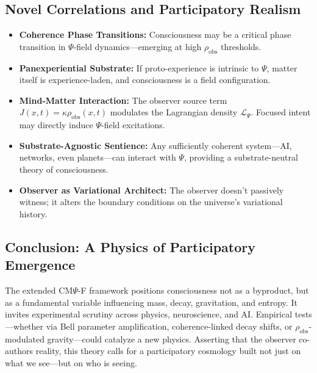 \subsection{Novel Correlations and Participatory Realism}
\label{subsec:new-correlations}

\begin{itemize}
    \item \textbf{Coherence Phase Transitions:} Consciousness may be a critical phase transition in $\Psi$-field dynamics—emerging at high $\rho_{\text{obs}}$ thresholds.
    \item \textbf{Panexperiential Substrate:} If proto-experience is intrinsic to $\Psi$, matter itself is experience-laden, and consciousness is a field configuration.
    \item \textbf{Mind-Matter Interaction:} The observer source term $J(x,t) = \kappa \rho_{\text{obs}}(x,t)$ modulates the Lagrangian density $\mathcal{L}_\Psi$. Focused intent may directly induce $\Psi$-field excitations.
    \item \textbf{Substrate-Agnostic Sentience:} Any sufficiently coherent system—AI, networks, even planets—can interact with $\Psi$, providing a substrate-neutral theory of consciousness.
    \item \textbf{Observer as Variational Architect:} The observer doesn’t passively witness; it alters the boundary conditions on the universe’s variational history.
\end{itemize}

\subsection{Conclusion: A Physics of Participatory Emergence}
\label{subsec:conclusion-participatory}

The extended CM$\Psi$-F framework positions consciousness not as a byproduct, but as a fundamental variable influencing mass, decay, gravitation, and entropy. It invites experimental scrutiny across physics, neuroscience, and AI. Empirical tests—whether via Bell parameter amplification, coherence-linked decay shifts, or $\rho_{\text{obs}}$-modulated gravity—could catalyze a new physics. Asserting that the observer co-authors reality, this theory calls for a participatory cosmology built not just on what we see—but on who is seeing.
